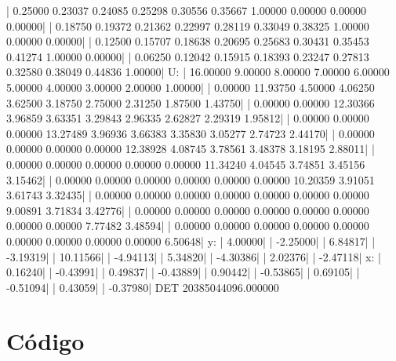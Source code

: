 \documentclass{homework}
\begin{document}
\begin{fortran}
	|   0.25000    0.23037    0.24085    0.25298    0.30556    0.35667    1.00000    0.00000    0.00000    0.00000|
	|   0.18750    0.19372    0.21362    0.22997    0.28119    0.33049    0.38325    1.00000    0.00000    0.00000|
	|   0.12500    0.15707    0.18638    0.20695    0.25683    0.30431    0.35453    0.41274    1.00000    0.00000|
	|   0.06250    0.12042    0.15915    0.18393    0.23247    0.27813    0.32580    0.38049    0.44836    1.00000|
	U:
	|  16.00000    9.00000    8.00000    7.00000    6.00000    5.00000    4.00000    3.00000    2.00000    1.00000|
	|   0.00000   11.93750    4.50000    4.06250    3.62500    3.18750    2.75000    2.31250    1.87500    1.43750|
	|   0.00000    0.00000   12.30366    3.96859    3.63351    3.29843    2.96335    2.62827    2.29319    1.95812|
	|   0.00000    0.00000    0.00000   13.27489    3.96936    3.66383    3.35830    3.05277    2.74723    2.44170|
	|   0.00000    0.00000    0.00000    0.00000   12.38928    4.08745    3.78561    3.48378    3.18195    2.88011|
	|   0.00000    0.00000    0.00000    0.00000    0.00000   11.34240    4.04545    3.74851    3.45156    3.15462|
	|   0.00000    0.00000    0.00000    0.00000    0.00000    0.00000   10.20359    3.91051    3.61743    3.32435|
	|   0.00000    0.00000    0.00000    0.00000    0.00000    0.00000    0.00000    9.00891    3.71834    3.42776|
	|   0.00000    0.00000    0.00000    0.00000    0.00000    0.00000    0.00000    0.00000    7.77482    3.48594|
	|   0.00000    0.00000    0.00000    0.00000    0.00000    0.00000    0.00000    0.00000    0.00000    6.50648|
	y:
	|   4.00000|
	|  -2.25000|
	|   6.84817|
	|  -3.19319|
	|  10.11566|
	|  -4.94113|
	|   5.34820|
	|  -4.30386|
	|   2.02376|
	|  -2.47118|
	x:
	|   0.16240|
	|  -0.43991|
	|   0.49837|
	|  -0.43889|
	|   0.90442|
	|  -0.53865|
	|   0.69105|
	|  -0.51094|
	|   0.43059|
	|  -0.37980|
	DET
	20385044096.000000
	\end{fortran}

	\pagebreak
	\appendixpage
	\appendix \section*{Código}
	
	
%		
\end{document}
